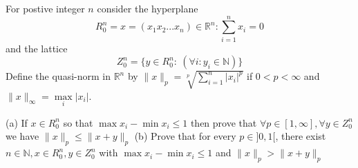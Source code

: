 For postive integer $n$ consider the hyperplane \[ R_0^n = {x=(x_1x_2...x_n)\in\mathbb{R}^n : \sum\limits^n_{i=1}x_i=0} \] and the lattice \[ Z_0^n = \{y \in R^n_0 : \ (\forall i: y_i \in \mathbb{N})\} \]
Define the quasi-norm in $\mathbb{R}^n$ by $\|x\|_p= \sqrt[p]{\sum\limits^{n}_{i=1}|x_i|^p}$ if $0<p<\infty$ and $\|x\|_{\infty} = \max\limits_i |x_i|$.

(a) If $x\in R^n_0$ so that $\max x_i - \min x_i \le 1$ then prove that $\forall p \in [1,\infty], \forall y \in Z^n_0$ we have $\|x\|_p\le\|x+y\|_p$
(b) Prove that for every $p\in ]0,1[$, there exist $n \in \mathbb{N}, x\in R^n_0, y\in Z^n_0$ with $\max x_i - \min x_i \le 1$ and $\|x\|_p>\|x+y\|_p$